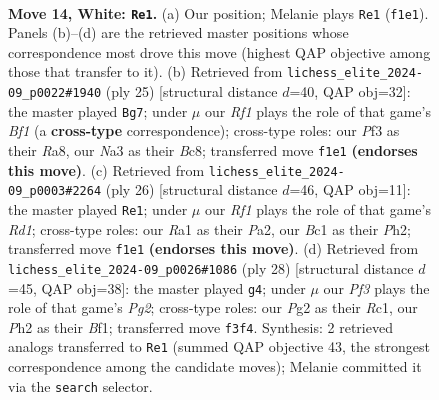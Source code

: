 \documentclass[11pt]{article}
\begin{document}
\clearpage

\begin{figure}[p]\centering
\begin{subfigure}{0.46\textwidth}\centering
\resizebox{\linewidth}{!}{%
\newchessgame
\chessboard[
  setfen={r3kb1r/p3n1pp/2ppb3/5p2/8/N2B1P2/PPP3PP/R1B2RK1 w kq - 2 14},
  showmover=false,
  pgfstyle=straightmove, color=movearrow, markmove={f1-e1}
]}
\caption{}
\end{subfigure}\hfill
\begin{subfigure}{0.46\textwidth}\centering
\resizebox{\linewidth}{!}{%
\newchessgame
\chessboard[
  setfen={r1b1kb1r/pp2pp2/7p/2pn4/8/2P2P2/PPBB1P1P/RN2K2R b KQkq - 2 13},
  showmover=false,
  pgfstyle=straightmove, color=movearrow, markmove={f8-g7}
]}
\caption{}
\end{subfigure}
\\[4pt]
\begin{subfigure}{0.46\textwidth}\centering
\resizebox{\linewidth}{!}{%
\newchessgame
\chessboard[
  setfen={2r1k1nr/1pp1bppp/p1b5/8/4NB2/2P2B2/PP3PPP/R2R2K1 w k - 3 14},
  showmover=false,
  pgfstyle=straightmove, color=movearrow, markmove={d1-e1}
]}
\caption{}
\end{subfigure}\hfill
\begin{subfigure}{0.46\textwidth}\centering
\resizebox{\linewidth}{!}{%
\newchessgame
\chessboard[
  setfen={2kr1b1r/pp3ppp/5n2/2p4b/8/2P1B2P/P2NPPP1/2R1KB1R w K - 1 15},
  showmover=false,
  pgfstyle=straightmove, color=movearrow, markmove={g2-g4}
]}
\caption{}
\end{subfigure}
\caption{\textbf{Move 14, White: \texttt{Re1}.} (a) Our position; Melanie plays \texttt{Re1} (\texttt{f1e1}). Panels (b)--(d) are the retrieved master positions whose correspondence most drove this move (highest QAP objective among those that transfer to it). (b) Retrieved from \texttt{lichess\_elite\_2024-09\_p0022\#1940} (ply 25) [structural distance $d$=40, QAP obj=32]: the master played \texttt{Bg7}; under $\mu$ our \emph{Rf1} plays the role of that game's \emph{Bf1} (a \textbf{cross-type} correspondence); cross-type roles: our \emph{P}f3 as their \emph{R}a8, our \emph{N}a3 as their \emph{B}c8; transferred move \texttt{f1e1} \textbf{(endorses this move)}. (c) Retrieved from \texttt{lichess\_elite\_2024-09\_p0003\#2264} (ply 26) [structural distance $d$=46, QAP obj=11]: the master played \texttt{Re1}; under $\mu$ our \emph{Rf1} plays the role of that game's \emph{Rd1}; cross-type roles: our \emph{R}a1 as their \emph{P}a2, our \emph{B}c1 as their \emph{P}h2; transferred move \texttt{f1e1} \textbf{(endorses this move)}. (d) Retrieved from \texttt{lichess\_elite\_2024-09\_p0026\#1086} (ply 28) [structural distance $d$=45, QAP obj=38]: the master played \texttt{g4}; under $\mu$ our \emph{Pf3} plays the role of that game's \emph{Pg2}; cross-type roles: our \emph{P}g2 as their \emph{R}c1, our \emph{P}h2 as their \emph{B}f1; transferred move \texttt{f3f4}. Synthesis: 2 retrieved analogs transferred to \texttt{Re1} (summed QAP objective 43, the strongest correspondence among the candidate moves); Melanie committed it via the \texttt{search} selector.}
\label{fig:thought-m26}
\end{figure}
\end{document}
